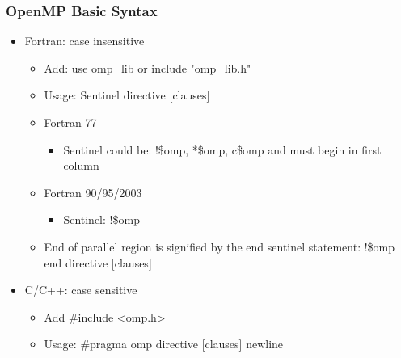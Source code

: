 \documentclass[c,mathserif,compress,xcolor=svgnames]{beamer}
\begin{document}
\begin{frame}
  \frametitle{\small OpenMP Basic Syntax}
  \begin{itemize}
    \item Fortran: case insensitive
    \begin{itemize}
      \item Add: {\color{green!40!black}use} {\color{blue}omp\_lib} or {\color{green!40!black}include} {\color{orange}"omp\_lib.h"}
      \item Usage: {\color{red!90!black}Sentinel directive [clauses]}
      \item Fortran 77
      \begin{itemize}
        \item {\color{red!90!black}Sentinel} could be: {\color{red!90!black}!\$omp, *\$omp, c\$omp} and must begin in first column
      \end{itemize}
      \item Fortran 90/95/2003
      \begin{itemize}
        \item {\color{red!90!black}Sentinel}: {\color{red!90!black}!\$omp}
      \end{itemize}
      \item End of parallel region is signified by the end sentinel statement: {\color{red!90!black}!\$omp end directive [clauses]}
    \end{itemize}
    \item C/C++: case sensitive
    \begin{itemize}
      \item Add {\color{green!40!black}\#include} <{\color{blue}omp.h}>
      \item Usage: {\color{red!90!black}\#pragma omp directive [clauses] newline}
    \end{itemize}
  \end{itemize}
\end{frame}
\end{document}
